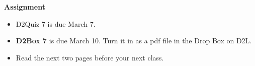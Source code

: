 \noindent
{\bf Assignment} \vspace{-.2in}
\begin{itemize}
\item  D2Quiz 7 is due March 7. 
\item {\bf D2Box 7} is due March 10.
    Turn it in as a pdf file in the Drop Box on D2L.
\item Read the next two pages before your next class.
\end{itemize}
